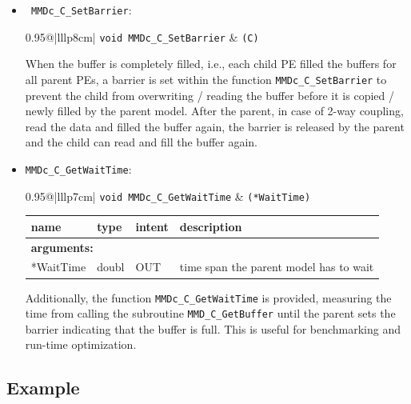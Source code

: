 \documentclass[twoside]{article}
\begin{document}
\begin{enumerate}
\begin{itemize}
\item  \verb| MMDc_C_SetBarrier|:

\begin{tabular*}{0.95\textwidth}{@{\extracolsep\fill}|lllp{8cm}|}
\hline
{}
{\tt void MMDc\_C\_SetBarrier} &
{\tt (C)}\\
\hline
\end{tabular*}
\smallskip

When the buffer is completely filled, i.e., each child PE filled the
buffers for all parent PEs, a barrier is set within the
function \verb|MMDc_C_SetBarrier| 
to  prevent the child from overwriting / reading the buffer before it
is copied / newly filled by the 
parent model. After the parent, in case of 2-way coupling, read the data and
filled the buffer again, the barrier is released by the parent
and the child can read and fill the buffer again. 

\item \verb|MMDc_C_GetWaitTime|:

\begin{tabular*}{0.95\textwidth}{@{\extracolsep\fill}|lllp{7cm}|}
\hline
{}
{\tt void MMDc\_C\_GetWaitTime} &
{\tt (*WaitTime)}\\
\hline
\end{tabular*}
\begin{tabular*}{0.95\textwidth}{@{\extracolsep\fill}|lllp{7cm}|}
name & type & intent & description\\
\hline
\multicolumn{4}{|l|}{\bf arguments:}\\
*WaitTime & doubl  & OUT & time span the parent model has to wait \\ 
\hline
\end{tabular*}
\smallskip

Additionally, the function \verb|MMDc_C_GetWaitTime| is provided, measuring 
the time from calling the subroutine \verb|MMD_C_GetBuffer|
 until the parent sets the barrier indicating that the buffer is full.
This is useful for benchmarking and run-time optimization.
\end{itemize}
\end{enumerate}


\subsection{Example}\label{sec:example}
\end{document}
